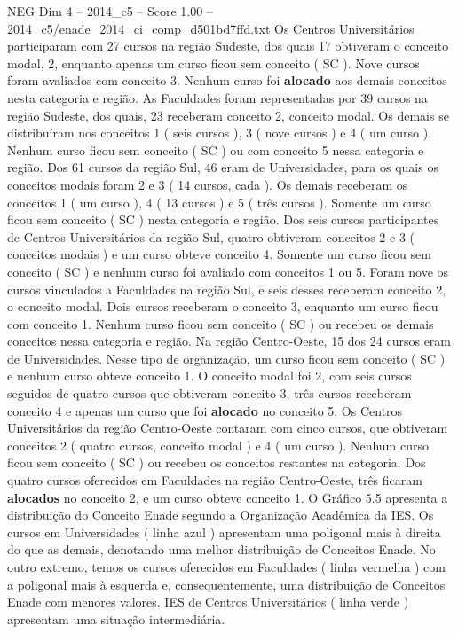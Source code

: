 \begin{textsample}{NEG Dim 4 – 2014\_c5 – Score 1.00 – 2014\_c5/enade\_2014\_ci\_comp\_d501bd7ffd.txt}
Os Centros Universitários participaram com 27 cursos na região Sudeste, dos quais 17 obtiveram o conceito modal, 2, enquanto apenas um curso ficou sem conceito ( SC ).
Nove cursos foram avaliados com conceito 3.
Nenhum curso foi \textbf{alocado} aos demais conceitos nesta categoria e região.
As Faculdades foram representadas por 39 cursos na região Sudeste, dos quais, 23 receberam conceito 2, conceito modal.
Os demais se distribuíram nos conceitos 1 ( seis cursos ), 3 ( nove cursos ) e 4 ( um curso ).
Nenhum curso ficou sem conceito ( SC ) ou com conceito 5 nessa categoria e região.
Dos 61 cursos da região Sul, 46 eram de Universidades, para os quais os conceitos modais foram 2 e 3 ( 14 cursos, cada ).
Os demais receberam os conceitos 1 ( um curso ), 4 ( 13 cursos ) e 5 ( três cursos ).
Somente um curso ficou sem conceito ( SC ) nesta categoria e região.
Dos seis cursos participantes de Centros Universitários da região Sul, quatro obtiveram conceitos 2 e 3 ( conceitos modais ) e um curso obteve conceito 4.
Somente um curso ficou sem conceito ( SC ) e nenhum curso foi avaliado com conceitos 1 ou 5.
Foram nove os cursos vinculados a Faculdades na região Sul, e seis desses receberam conceito 2, o conceito modal.
Dois cursos receberam o conceito 3, enquanto um curso ficou com conceito 1.
Nenhum curso ficou sem conceito ( SC ) ou recebeu os demais conceitos nessa categoria e região.
Na região Centro-Oeste, 15 dos 24 cursos eram de Universidades.
Nesse tipo de organização, um curso ficou sem conceito ( SC ) e nenhum curso obteve conceito 1.
O conceito modal foi 2, com seis cursos seguidos de quatro cursos que obtiveram conceito 3, três cursos receberam conceito 4 e apenas um curso que foi \textbf{alocado} no conceito 5.
Os Centros Universitários da região Centro-Oeste contaram com cinco cursos, que obtiveram conceitos 2 ( quatro cursos, conceito modal ) e 4 ( um curso ).
Nenhum curso ficou sem conceito ( SC ) ou recebeu os conceitos restantes na categoria.
Dos quatro cursos oferecidos em Faculdades na região Centro-Oeste, três ficaram \textbf{alocados} no conceito 2, e um curso obteve conceito 1.
O Gráfico 5.5 apresenta a distribuição do Conceito Enade segundo a Organização Acadêmica da IES.
Os cursos em Universidades ( linha azul ) apresentam uma poligonal mais à direita do que as demais, denotando uma melhor distribuição de Conceitos Enade.
No outro extremo, temos os cursos oferecidos em Faculdades ( linha vermelha ) com a poligonal mais à esquerda e, consequentemente, uma distribuição de Conceitos Enade com menores valores.
IES de Centros Universitários ( linha verde ) apresentam uma situação intermediária.

\end{textsample}
